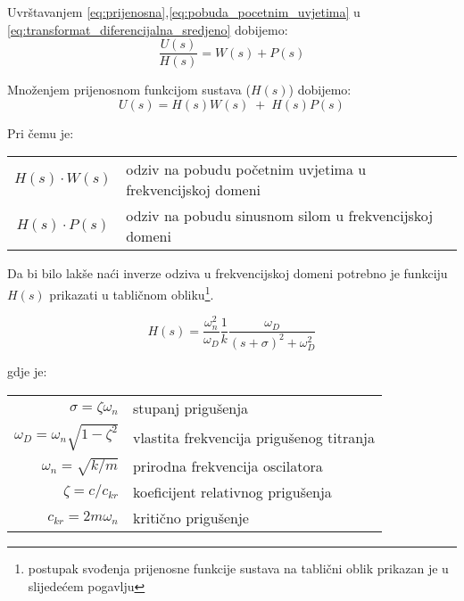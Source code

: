 Uvrštavanjem \eqref{eq:prijenosna},\eqref{eq:pobuda_pocetnim_uvjetima} u 
\eqref{eq:transformat_diferencijalna_sredjeno} dobijemo:
\begin{equation*}
	\frac{U(s)}{H(s)}=W(s)+P(s)
\end{equation*}

Množenjem prijenosnom funkcijom sustava ($H(s)$) dobijemo:
\begin{equation}\label{eq:uk_rjesenje_freq}
    U(s) = H(s)W(s)\; + \; H(s)P(s)
\end{equation}

Pri čemu je:
\begin{table}[H]
\begin{tabular}{c l}
	$H(s)\cdot W(s)$ & odziv na pobudu početnim uvjetima u frekvencijskoj domeni\\
	$H(s)\cdot P(s)$ & odziv na pobudu sinusnom silom u frekvencijskoj domeni\\
\end{tabular}
\end{table}

\newpage
Da bi bilo lakše naći inverze odziva u frekvencijskoj domeni potrebno je funkciju  
$H(s)$ prikazati u tabličnom obliku\footnote{postupak svođenja prijenosne funkcije
sustava na tablični oblik prikazan je u slijedećem pogavlju}.

\begin{equation}\label{eq:pfs_tablicni_oblik}
    H(s) = \frac{\omega_n^2}{\omega_D}
           \frac{1}{k}
           \frac{\omega_D}{(s+\sigma)^2+\omega_D^2}
\end{equation}

gdje je:\\
\begin{table}[H]
    \begin{tabular}{r l}
        $\sigma=\zeta\omega_n$ & stupanj prigušenja\\
        $\omega_D=\omega_n\sqrt{1-\zeta^2}$ & vlastita frekvencija prigušenog titranja\\
        $\omega_n=\sqrt{k/m}$ & prirodna frekvencija oscilatora\\
        $\zeta=c/c_{kr}$ & koeficijent relativnog prigušenja\\
        $c_{kr}=2m\omega_n$ & kritično prigušenje
    \end{tabular}
\end{table}

